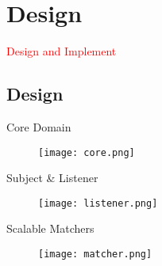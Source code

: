 \section{Design}
\label{sec:design}

\begin{frame}
  \begin{center}
    \Huge{\textcolor{red}{Design and Implement}}
  \end{center}
\end{frame}

\subsection{Design}

\begin{frame}{Core Domain}
    \centering
    \begin{figure}
      \centering
      \texttt{[image: core.png]}
    \end{figure}
\end{frame}

\begin{frame}{Subject \& Listener}
    \centering
    \begin{figure}
      \centering
      \texttt{[image: listener.png]}
    \end{figure}
\end{frame}

\begin{frame}{Scalable Matchers}
    \centering
    \begin{figure}
      \centering
      \texttt{[image: matcher.png]}
    \end{figure}
\end{frame}
